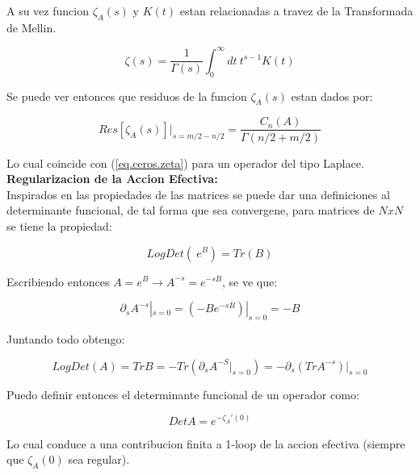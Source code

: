 A su vez funcion $\zeta _A (s) $ y $K(t)$ estan relacionadas a travez de la Transformada de Mellin.



\begin{equation}
\zeta (s) = \frac{1}{\Gamma (s) } 
\int _0 ^{\infty} dt \
t ^{s-1} K(t) 
\end{equation}

Se puede ver entonces que residuos de la funcion $\zeta _A (s)$ estan dados por:

\begin{equation}
Res[\zeta _A (s)] | _{s= m/2 - n/2} = \frac{C _n (A)}{\Gamma (n/2 + m/2)}
\end{equation}

Lo cual coincide con (\ref{eq.ceros.zeta}) para un operador del tipo Laplace. \\

\textbf{Regularizacion de la Accion Efectiva:} \\

Inspirados en las propiedades de las matrices se puede dar una definiciones al determinante funcional, de tal forma que sea convergene, para matrices de $ NxN$ se tiene la propiedad:

\begin{equation}
Log  Det \left( \ e ^B \right)  = Tr (B)
\end{equation}

Escribiendo entonces $A= e ^{B} \rightarrow A ^{-s} = e ^{-s B}$, se ve que:

\begin{equation}
\partial _s A ^{-s} | _{s=0} = (- B e ^{-s B}) | _{s=0} = - B
\end{equation}

Juntando todo obtengo:

\begin{equation}
Log Det ( A ) = Tr B = - Tr  \left( \partial _s A ^{-S} | _{s=0} \right) =
 - \partial _s \left( Tr A ^{-s} \right) | _{s=0}
\end{equation}

Puedo definir entonces el determinante funcional de un operador como:

\begin{equation}
Det A = e ^{- \zeta _A ' (0)}
\end{equation}

Lo cual conduce a una contribucion finita a 1-loop de la accion efectiva (siempre que $\zeta _A (0)$ sea regular). \\


